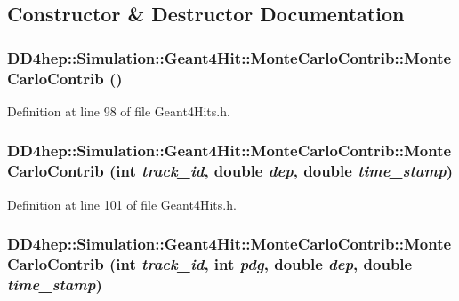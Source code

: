 \subsection{Constructor \& Destructor Documentation}
\hypertarget{struct_d_d4hep_1_1_simulation_1_1_geant4_hit_1_1_monte_carlo_contrib_ade0fa203d957c85105826a23916ead5e}{
\subsubsection[{MonteCarloContrib}]{\setlength{\rightskip}{0pt plus 5cm}DD4hep::Simulation::Geant4Hit::MonteCarloContrib::MonteCarloContrib ()}}
\label{struct_d_d4hep_1_1_simulation_1_1_geant4_hit_1_1_monte_carlo_contrib_ade0fa203d957c85105826a23916ead5e}


Definition at line 98 of file Geant4Hits.h.\hypertarget{struct_d_d4hep_1_1_simulation_1_1_geant4_hit_1_1_monte_carlo_contrib_a3f041eca3c402f2a8ba5fec12151e42f}{
\subsubsection[{MonteCarloContrib}]{\setlength{\rightskip}{0pt plus 5cm}DD4hep::Simulation::Geant4Hit::MonteCarloContrib::MonteCarloContrib (int {\em track\_\-id}, \/  double {\em dep}, \/  double {\em time\_\-stamp})}}
\label{struct_d_d4hep_1_1_simulation_1_1_geant4_hit_1_1_monte_carlo_contrib_a3f041eca3c402f2a8ba5fec12151e42f}


Definition at line 101 of file Geant4Hits.h.\hypertarget{struct_d_d4hep_1_1_simulation_1_1_geant4_hit_1_1_monte_carlo_contrib_af4908b6ddf6b878d9d529a5e614ca0de}{
\subsubsection[{MonteCarloContrib}]{\setlength{\rightskip}{0pt plus 5cm}DD4hep::Simulation::Geant4Hit::MonteCarloContrib::MonteCarloContrib (int {\em track\_\-id}, \/  int {\em pdg}, \/  double {\em dep}, \/  double {\em time\_\-stamp})}}
\label{struct_d_d4hep_1_1_simulation_1_1_geant4_hit_1_1_monte_carlo_contrib_af4908b6ddf6b878d9d529a5e614ca0de}


